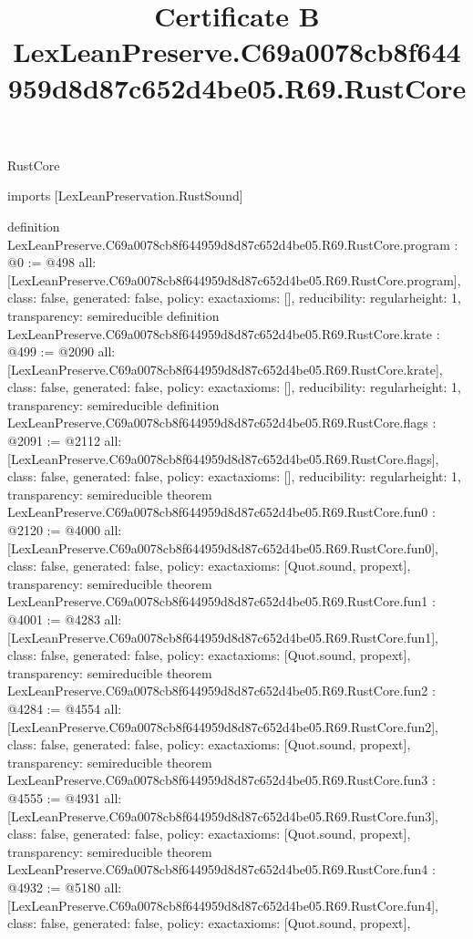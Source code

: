 \begin{lexlean}{RustCore}
\title{Certificate B LexLeanPreserve.C69a0078cb8f644959d8d87c652d4be05.R69.RustCore}
\begin{coremodule}
imports [LexLeanPreservation.RustSound]

definition LexLeanPreserve.C69a0078cb8f644959d8d87c652d4be05.R69.RustCore.program : @0 := @498 {
  all: [LexLeanPreserve.C69a0078cb8f644959d8d87c652d4be05.R69.RustCore.program],
  class: false,
  generated: false,
  policy: exact{axioms: []},
  reducibility: regular{height: 1},
  transparency: semireducible
}
definition LexLeanPreserve.C69a0078cb8f644959d8d87c652d4be05.R69.RustCore.krate : @499 := @2090 {
  all: [LexLeanPreserve.C69a0078cb8f644959d8d87c652d4be05.R69.RustCore.krate],
  class: false,
  generated: false,
  policy: exact{axioms: []},
  reducibility: regular{height: 1},
  transparency: semireducible
}
definition LexLeanPreserve.C69a0078cb8f644959d8d87c652d4be05.R69.RustCore.flags : @2091 := @2112 {
  all: [LexLeanPreserve.C69a0078cb8f644959d8d87c652d4be05.R69.RustCore.flags],
  class: false,
  generated: false,
  policy: exact{axioms: []},
  reducibility: regular{height: 1},
  transparency: semireducible
}
theorem LexLeanPreserve.C69a0078cb8f644959d8d87c652d4be05.R69.RustCore.fun0 : @2120 := @4000 {
  all: [LexLeanPreserve.C69a0078cb8f644959d8d87c652d4be05.R69.RustCore.fun0],
  class: false,
  generated: false,
  policy: exact{axioms: [Quot.sound, propext]},
  transparency: semireducible
}
theorem LexLeanPreserve.C69a0078cb8f644959d8d87c652d4be05.R69.RustCore.fun1 : @4001 := @4283 {
  all: [LexLeanPreserve.C69a0078cb8f644959d8d87c652d4be05.R69.RustCore.fun1],
  class: false,
  generated: false,
  policy: exact{axioms: [Quot.sound, propext]},
  transparency: semireducible
}
theorem LexLeanPreserve.C69a0078cb8f644959d8d87c652d4be05.R69.RustCore.fun2 : @4284 := @4554 {
  all: [LexLeanPreserve.C69a0078cb8f644959d8d87c652d4be05.R69.RustCore.fun2],
  class: false,
  generated: false,
  policy: exact{axioms: [Quot.sound, propext]},
  transparency: semireducible
}
theorem LexLeanPreserve.C69a0078cb8f644959d8d87c652d4be05.R69.RustCore.fun3 : @4555 := @4931 {
  all: [LexLeanPreserve.C69a0078cb8f644959d8d87c652d4be05.R69.RustCore.fun3],
  class: false,
  generated: false,
  policy: exact{axioms: [Quot.sound, propext]},
  transparency: semireducible
}
theorem LexLeanPreserve.C69a0078cb8f644959d8d87c652d4be05.R69.RustCore.fun4 : @4932 := @5180 {
  all: [LexLeanPreserve.C69a0078cb8f644959d8d87c652d4be05.R69.RustCore.fun4],
  class: false,
  generated: false,
  policy: exact{axioms: [Quot.sound, propext]},
}
\end{coremodule}
\end{lexlean}
